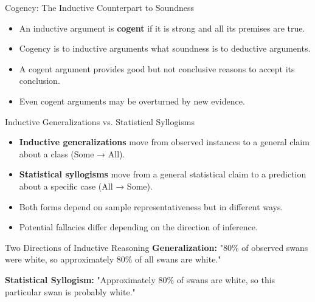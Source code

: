 \documentclass{beamer}
\begin{document}
\begin{frame}{Cogency: The Inductive Counterpart to Soundness}
    \begin{itemize}
        \item An inductive argument is \textbf{cogent} if it is strong and all its premises are true.
        \item Cogency is to inductive arguments what soundness is to deductive arguments.
        \item A cogent argument provides good but not conclusive reasons to accept its conclusion.
        \item Even cogent arguments may be overturned by new evidence.
    \end{itemize}
    
\end{frame}

\begin{frame}{Inductive Generalizations vs. Statistical Syllogisms}
    \begin{itemize}
        \item \textbf{Inductive generalizations} move from observed instances to a general claim about a class (Some → All).
        \item \textbf{Statistical syllogisms} move from a general statistical claim to a prediction about a specific case (All → Some).
        \item Both forms depend on sample representativeness but in different ways.
        \item Potential fallacies differ depending on the direction of inference.
    \end{itemize}
    
    \begin{exampleblock}{Two Directions of Inductive Reasoning}
        \textbf{Generalization:} "80\% of observed swans were white, so approximately 80\% of all swans are white."
        
        \textbf{Statistical Syllogism:} "Approximately 80\% of swans are white, so this particular swan is probably white."
    \end{exampleblock}
\end{frame}
\end{document}
